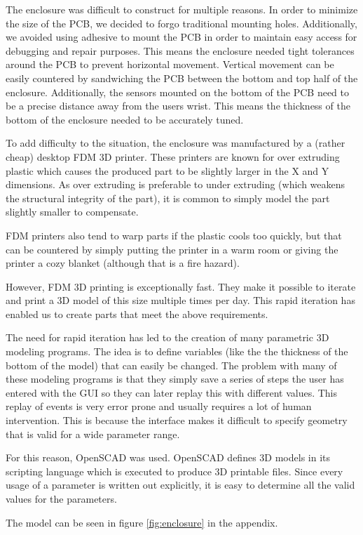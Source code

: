 
The enclosure was difficult to construct for multiple reasons.  In order to
minimize the size of the PCB, we decided to forgo traditional mounting holes.
Additionally, we avoided using adhesive to mount the PCB in order to maintain
easy access for debugging and repair purposes.  This means the enclosure needed
tight tolerances around the PCB to prevent horizontal movement.  Vertical
movement can be easily countered by sandwiching the PCB between the bottom and
top half of the enclosure.  Additionally, the sensors mounted on the bottom of
the PCB need to be a precise distance away from the users wrist.  This means
the thickness of the bottom of the enclosure needed to be accurately tuned.

To add difficulty to the situation, the enclosure was manufactured by a (rather
cheap) desktop FDM 3D printer.  These printers are known for over extruding
plastic which causes the produced part to be slightly larger in the X and Y
dimensions.  As over extruding is preferable to under extruding (which weakens
the structural integrity of the part), it is common to simply model the part
slightly smaller to compensate.

FDM printers also tend to warp parts if the plastic cools too quickly, but that
can be countered by simply putting the printer in a warm room or giving the
printer a cozy blanket (although that is a fire hazard).

However, FDM 3D printing is exceptionally fast.  They make it possible to
iterate and print a 3D model of this size multiple times per day.  This rapid
iteration has enabled us to create parts that meet the above requirements.

The need for rapid iteration has led to the creation of many parametric 3D
modeling programs.  The idea is to define variables (like the the thickness of
the bottom of the model) that can easily be changed.  The problem with many of
these modeling programs is that they simply save a series of steps the user has
entered with the GUI so they can later replay this with different values.  This
replay of events is very error prone and usually requires a lot of human
intervention.  This is because the interface makes it difficult to specify
geometry that is valid for a wide parameter range.

For this reason, OpenSCAD was used.  OpenSCAD defines 3D models in its
scripting language which is executed to produce 3D printable files.  Since
every usage of a parameter is written out explicitly, it is easy to determine
all the valid values for the parameters.

The model can be seen in figure \ref{fig:enclosure} in the appendix.
